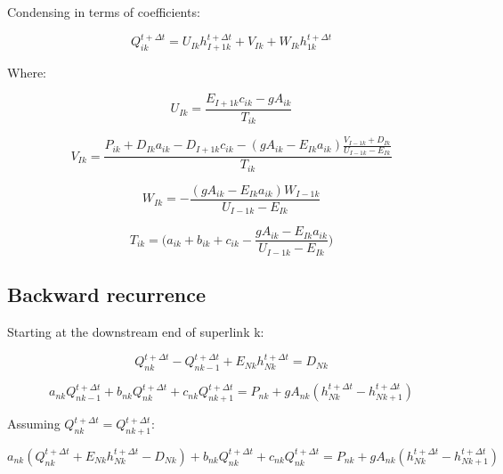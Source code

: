 \documentclass[11pt]{article}
\begin{document}
Condensing in terms of coefficients:

\begin{equation}
  \boxed{
 Q_{ik}^{t + \Delta t} = U_{Ik} h_{I + 1k}^{t + \Delta t} + V_{Ik} + W_{Ik} h_{1k}^{t + \Delta t} 
 }
\end{equation}

Where:

\begin{equation}
  \boxed{
    U_{Ik} = \frac{E_{I + 1k} c_{ik} - g A_{ik}}{T_{ik}}
 }
\end{equation}

\begin{equation}
  \boxed{
    V_{Ik} = \frac{ P_{ik} + D_{Ik} a_{ik} - D_{I + 1k} c_{ik} - (g A_{ik} - E_{Ik} a_{ik}) \frac{ V_{I-1k} + D_{Ik} }{ U_{I-1k} - E_{Ik} }}{T_{ik}}
 }
\end{equation}

\begin{equation}
  \boxed{
    W_{Ik} = - \frac{(g A_{ik} - E_{Ik} a_{ik}) W_{I - 1k} }{U_{I - 1k} - E_{Ik}}
 }
\end{equation}

\begin{equation}
  \boxed{
 T_{ik} = \biggl(a_{ik} + b_{ik} + c_{ik} - \frac{ g A_{ik} - E_{Ik} a_{ik} }{U_{I-1k} - E_{Ik}} \biggr) 
 }
\end{equation}

\clearpage

\subsection*{Backward recurrence}

Starting at the downstream end of superlink k:

\begin{equation}
  Q_{nk}^{t + \Delta t} - Q_{nk - 1}^{t + \Delta t} + E_{Nk} h_{Nk}^{t + \Delta t} = D_{Nk}
\end{equation}


\begin{equation}
   a_{nk} Q_{nk - 1}^{t + \Delta t} + b_{nk} Q_{nk}^{t + \Delta t} + c_{nk} Q_{nk + 1}^{t + \Delta t} = P_{nk} + g A_{nk} (h_{Nk}^{t + \Delta t} - h_{Nk+1}^{t + \Delta t})
\end{equation}

Assuming $Q_{nk}^{t + \Delta t} = Q_{nk+1}^{t + \Delta t}$:

\begin{equation}
  a_{nk} (Q_{nk}^{t + \Delta t} + E_{Nk} h_{Nk}^{t + \Delta t} - D_{Nk}) + b_{nk} Q_{nk}^{t + \Delta t} + c_{nk} Q_{nk}^{t + \Delta t} = P_{nk} + g A_{nk} (h_{Nk}^{t + \Delta t} - h_{Nk + 1}^{t + \Delta t})
\end{equation}
\end{document}
